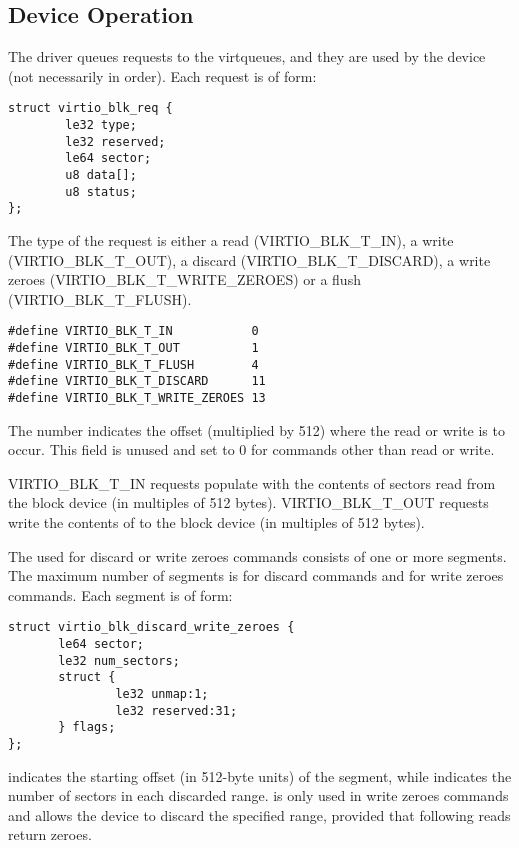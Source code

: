 \subsection{Device Operation}\label{sec:Device Types / Block Device / Device Operation}

The driver queues requests to the virtqueues, and they are used by
the device (not necessarily in order). Each request is of form:

\begin{lstlisting}
struct virtio_blk_req {
        le32 type;
        le32 reserved;
        le64 sector;
        u8 data[];
        u8 status;
};
\end{lstlisting}

The type of the request is either a read (VIRTIO_BLK_T_IN), a write
(VIRTIO_BLK_T_OUT), a discard (VIRTIO_BLK_T_DISCARD), a write zeroes
(VIRTIO_BLK_T_WRITE_ZEROES) or a flush (VIRTIO_BLK_T_FLUSH).

\begin{lstlisting}
#define VIRTIO_BLK_T_IN           0
#define VIRTIO_BLK_T_OUT          1
#define VIRTIO_BLK_T_FLUSH        4
#define VIRTIO_BLK_T_DISCARD      11
#define VIRTIO_BLK_T_WRITE_ZEROES 13
\end{lstlisting}

The  number indicates the offset (multiplied by 512) where
the read or write is to occur. This field is unused and set to 0 for
commands other than read or write.

VIRTIO_BLK_T_IN requests populate  with the contents of sectors
read from the block device (in multiples of 512 bytes).  VIRTIO_BLK_T_OUT
requests write the contents of  to the block device (in multiples
of 512 bytes).

The  used for discard or write zeroes commands consists of one or
more segments.  The maximum number of segments is  for
discard commands and  for write zeroes commands.
Each segment is of form:

\begin{lstlisting}
struct virtio_blk_discard_write_zeroes {
       le64 sector;
       le32 num_sectors;
       struct {
               le32 unmap:1;
               le32 reserved:31;
       } flags;
};
\end{lstlisting}

 indicates the starting offset (in 512-byte units) of the
segment, while  indicates the number of sectors in each
discarded range.  is only used in write zeroes commands and allows
the device to discard the specified range, provided that following reads return
zeroes.

